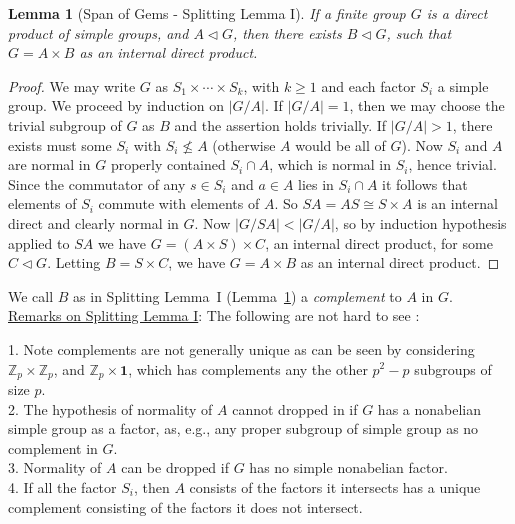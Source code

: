 \documentclass[a4paper,11pt]{amsart}
\newtheorem{lemma}[theorem]{Lemma}
\theoremstyle{definition}
\newcommand{\Z}{\mathbb{Z}}
\newcommand{\1}{{\mathbf 1}}
\begin{document}
 \begin{lemma}[Span of Gems - Splitting Lemma I]\label{SpanOfGems}
 If a finite group $G$ is a direct product of simple groups, and $A \lhd G$, then there exists $B\lhd G$, such that $G=A\times B$ as an internal direct product.  
\end{lemma}
\begin{proof} 
We may write $G$ as $S_1 \times \cdots \times S_k$, with $k\geq 1$ and each factor $S_i$ a simple group.
We proceed by induction on $|G/A|$.  If $|G/A|=1$, then we may choose the trivial subgroup of $G$ as $B$ and the assertion holds trivially. 
If $|G/A|>1$, there exists must some $S_i$ with $S_i\not\leq A$ (otherwise $A$ would be all of $G$). Now $S_i$ and $A$ are normal in $G$ properly contained $S_i\cap A$, which is normal in $S_i$, hence trivial. Since the commutator of any $s\in S_i$ and $a\in A$ lies in $S_i\cap A$ it follows that elements of $S_i$ commute with elements of $A$. So $SA=AS \cong S\times A$ is an internal direct and clearly normal in $G$. Now $|G/SA| < |G/A|$, so by induction hypothesis applied to $SA$ we have $G=(A\times S )\times C$, an internal direct product, for some $C\lhd G$. Letting $B=S\times C$, we have $G=A\times B$ as an internal direct product.
\end{proof}



We call $B$ as in Splitting Lemma~I (Lemma~\ref{SpanOfGems}) a {\em complement} to $A$ in $G$.  \\
 
\noindent \underline{Remarks on Splitting Lemma I}:
 The following are not hard to see : 

 1. Note complements are not generally unique as can be seen by considering $\Z_p \times \Z_p$, and $\Z_p \times \1$, which has complements any the other $p^2-p$ subgroups of size $p$.\\ 
 2. The hypothesis of normality of $A$ cannot dropped in if $G$ has a nonabelian simple group as a factor, as, e.g., any proper subgroup of simple group as no complement in $G$.\\
 3. Normality of $A$ can be dropped if $G$ has no simple nonabelian factor. \\
 4. If all the factor $S_i$, then $A$ consists of the factors it intersects has a unique complement consisting of the factors it does not intersect.
 
 
\end{document}

